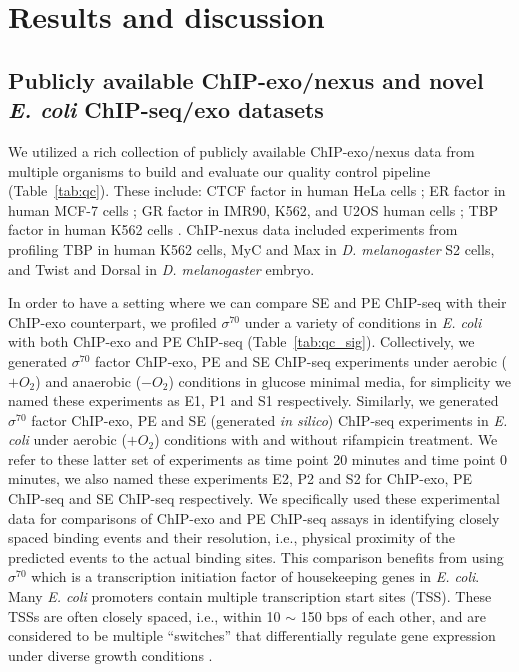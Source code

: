 \documentclass{bmcart}
\newcommand{\SK}[1]{\textcolor{red}{SK: #1}}
\newcommand{\sig}{\sigma^{70}}
\begin{document}
\section*{Results and discussion}
\label{sec:results}

\subsection*{Publicly available ChIP-exo/nexus and novel \textit{E. coli} ChIP-seq/exo datasets}
We utilized a rich collection of publicly available ChIP-exo/nexus
data from multiple organisms to build and evaluate our quality control
pipeline (Table~\ref{tab:qc}). These include: CTCF factor in human
HeLa cells \cite{exo1}; ER factor in human MCF-7 cells
\cite{exoillumina}; GR factor in IMR90, K562, and U2OS human cells
\cite{starick15}; TBP factor in human K562 cells \cite{venters13}.
ChIP-nexus data included experiments from \cite{chipnexus} profiling
TBP in human K562 cells, MyC and Max in \textit{D. melanogaster} S2
cells, and Twist and Dorsal in \textit{D. melanogaster} embryo.

In order to have a setting where we can compare SE and PE ChIP-seq
with their ChIP-exo counterpart, we profiled $\sig$ under a variety of
conditions in \textit{E. coli} with both ChIP-exo and PE ChIP-seq
(Table~\ref{tab:qc_sig}). Collectively, we generated $\sig$ factor
ChIP-exo, PE and SE ChIP-seq experiments under aerobic ($+O_2$) and
anaerobic ($-O_2$) conditions in glucose minimal media, for simplicity
we named these experiments as E1, P1 and S1 respectively. Similarly,
we generated $\sig$ factor ChIP-exo, PE and SE (generated \textit{in
  silico}) ChIP-seq experiments in \textit{E. coli} under aerobic
($+O_2$) conditions with and without rifampicin treatment.  We refer
to these latter set of experiments as time point 20 minutes and time
point 0 minutes, we also named these experiments E2, P2 and S2 for
ChIP-exo, PE ChIP-seq and SE ChIP-seq respectively.
We specifically used these experimental data for comparisons of
ChIP-exo and PE ChIP-seq assays in identifying closely spaced binding
events and their resolution, i.e., physical proximity of the predicted
events to the actual binding sites.  This comparison benefits from
using $\sig$ which is a transcription initiation factor of
housekeeping genes in \textit{E. coli}. Many \textit{E. coli}
promoters contain multiple transcription start sites (TSS). These TSSs
are often closely spaced, i.e., within 10 $\sim$ 150 bps of each
other, and are considered to be multiple ``switches'' that
differentially regulate gene expression under diverse growth
conditions \cite{regulondb}.
\end{document}
